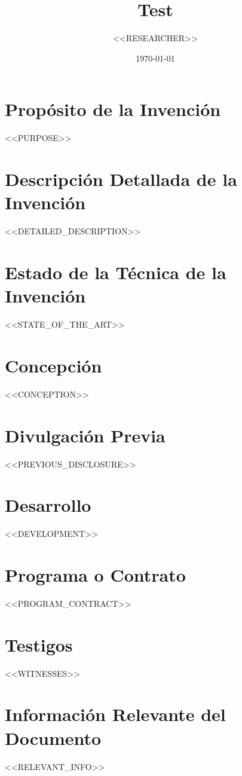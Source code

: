 \documentclass{article}
\title{Test}
\author{<<RESEARCHER>>}
\date{\today}
\begin{document}
\maketitle

\section*{Propósito de la Invención}
<<PURPOSE>>

\section*{Descripción Detallada de la Invención}
<<DETAILED_DESCRIPTION>>

\section*{Estado de la Técnica de la Invención}
<<STATE_OF_THE_ART>>

\section*{Concepción}
<<CONCEPTION>>

\section*{Divulgación Previa}
<<PREVIOUS_DISCLOSURE>>

\section*{Desarrollo}
<<DEVELOPMENT>>

\section*{Programa o Contrato}
<<PROGRAM_CONTRACT>>

\section*{Testigos}
<<WITNESSES>>

\section*{Información Relevante del Documento}
<<RELEVANT_INFO>>
\end{document}
